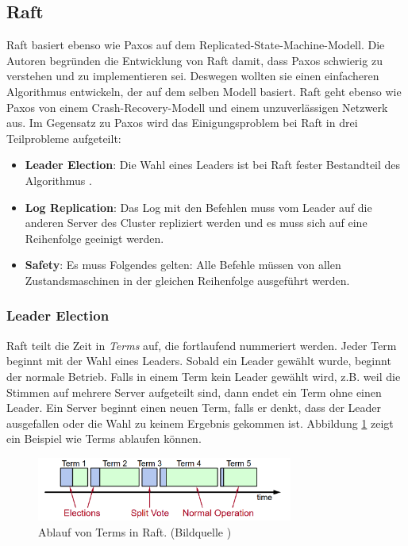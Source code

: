 \subsection{Raft}
\label{raft}

Raft \cite{raft, raft-thesis} basiert ebenso wie Paxos auf dem Replicated-State-Machine-Modell. Die Autoren begründen die Entwicklung von Raft damit, dass Paxos schwierig zu verstehen und zu implementieren sei. Deswegen wollten sie einen einfacheren Algorithmus entwickeln, der auf dem selben Modell basiert. Raft geht ebenso wie Paxos von einem Crash-Recovery-Modell und einem unzuverlässigen Netzwerk aus.
Im Gegensatz zu Paxos wird das Einigungsproblem bei Raft in drei Teilprobleme aufgeteilt:
\begin{itemize}
	\item \textbf{Leader Election}: Die Wahl eines Leaders ist bei Raft fester Bestandteil des Algorithmus .
	\item \textbf{Log Replication}: Das Log mit den Befehlen muss vom Leader auf die anderen Server des Cluster repliziert werden und es muss sich auf eine Reihenfolge geeinigt werden.
	\item \textbf{Safety}: Es muss Folgendes gelten: Alle Befehle müssen von allen Zustandsmaschinen in der gleichen Reihenfolge ausgeführt werden.
\end{itemize}

\subsubsection{Leader Election}

Raft teilt die Zeit in \textit{Terms} auf, die fortlaufend nummeriert werden. Jeder Term beginnt mit der Wahl eines Leaders. Sobald ein Leader gewählt wurde, beginnt der normale Betrieb. Falls in einem Term kein Leader gewählt wird, z.B. weil die Stimmen auf mehrere Server aufgeteilt sind, dann endet ein Term ohne einen Leader. Ein Server beginnt einen neuen Term, falls er denkt, dass der Leader ausgefallen oder die Wahl zu keinem Ergebnis gekommen ist. Abbildung \ref{fig:terms} zeigt ein Beispiel wie Terms ablaufen können. \\

\begin{figure}[H]
	\centering
	\includegraphics[width=0.75\textwidth]{img/terms.png}
	\caption{Ablauf von Terms in Raft.  (Bildquelle \cite{raft-user-study})}
	\label{fig:terms}
\end{figure}

